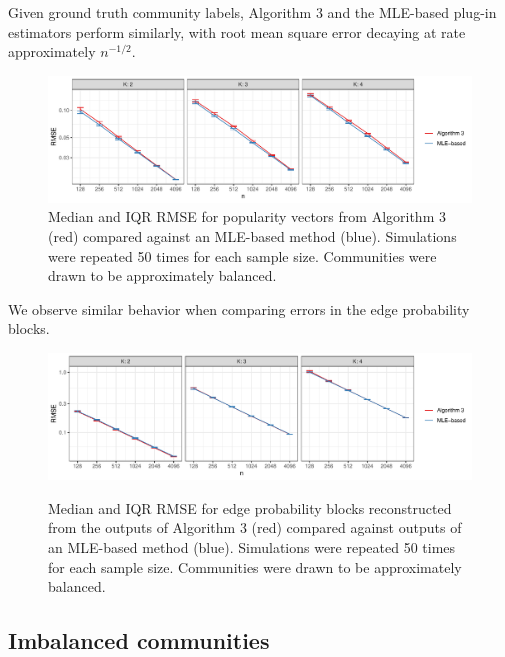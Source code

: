 \documentclass[12pt]{article}
\begin{document}
Given ground truth community labels, Algorithm 3 and the MLE-based
plug-in estimators \cite{307cbeb9b1be48299388437423d94bf1} 
perform similarly, with root mean square
error decaying at rate approximately \(n^{-1/2}\).

\begin{figure}[H]

{\centering \includegraphics{summary_files/figure-latex/lambda_est_k-1}

}

\caption{Median and IQR RMSE for popularity vectors from Algorithm 3 (red) compared against an MLE-based method (blue). Simulations were repeated 50 times for each sample size. Communities were drawn to be approximately balanced.}\label{fig:lambda_est_k}
\end{figure}

We observe similar behavior when comparing errors in the edge probability blocks. 

\begin{figure}[H]
{\centering \includegraphics{summary_files/figure-latex/lambda_est_p-1}}
\caption{Median and IQR RMSE for edge probability blocks reconstructed from the outputs of Algorithm 3 (red) compared against outputs of an MLE-based method (blue). Simulations were repeated 50 times for each sample size. Communities were drawn to be approximately balanced.}
\end{figure}

\hypertarget{imbalanced-communities}{%
\subsection{Imbalanced communities}\label{imbalanced-communities}}
\end{document}
